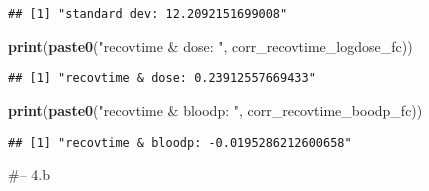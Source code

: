 \documentclass[
]{article}
\newenvironment{Shaded}{\begin{snugshade}}{\end{snugshade}}
\newcommand{\DataTypeTok}[1]{\textcolor[rgb]{0.13,0.29,0.53}{#1}}
\newcommand{\KeywordTok}[1]{\textcolor[rgb]{0.13,0.29,0.53}{\textbf{#1}}}
\newcommand{\NormalTok}[1]{#1}
\newcommand{\OperatorTok}[1]{\textcolor[rgb]{0.81,0.36,0.00}{\textbf{#1}}}
\newcommand{\OtherTok}[1]{\textcolor[rgb]{0.56,0.35,0.01}{#1}}
\newcommand{\StringTok}[1]{\textcolor[rgb]{0.31,0.60,0.02}{#1}}
\begin{document}
\begin{verbatim}
## [1] "standard dev: 12.2092151699008"
\end{verbatim}

\begin{Shaded}
\begin{Highlighting}[]
\KeywordTok{print}\NormalTok{(}\KeywordTok{paste0}\NormalTok{(}\StringTok{"recovtime & dose: "}\NormalTok{, corr_recovtime_logdose_fc))}
\end{Highlighting}
\end{Shaded}

\begin{verbatim}
## [1] "recovtime & dose: 0.23912557669433"
\end{verbatim}

\begin{Shaded}
\begin{Highlighting}[]
\KeywordTok{print}\NormalTok{(}\KeywordTok{paste0}\NormalTok{(}\StringTok{"recovtime & bloodp: "}\NormalTok{, corr_recovtime_boodp_fc))}
\end{Highlighting}
\end{Shaded}

\begin{verbatim}
## [1] "recovtime & bloodp: -0.0195286212600658"
\end{verbatim}

\#-- 4.b

\begin{Shaded}
\end{Shaded}
\end{document}
